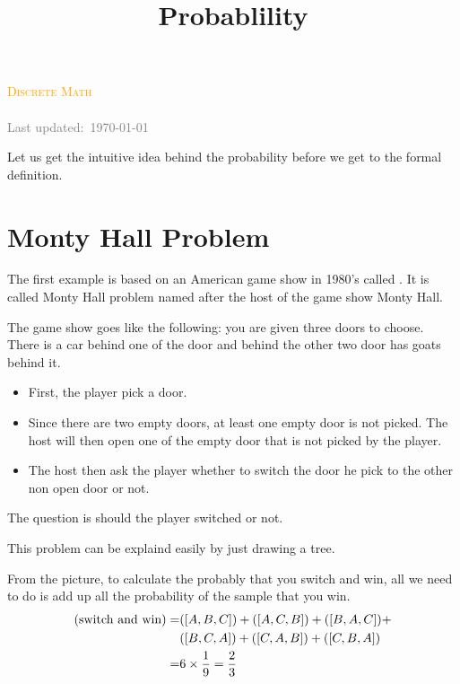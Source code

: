 \documentclass[a4paper, 12pt]{article}
\title{Probablility}
\let\Pr\relax
\DeclareMathOperator{\Pr}{Pr}
\newcommand{\course}{Discrete Math}
\begin{document}
\begin{center}
	\textcolor{orange}{\textsc{\course}}\\
	\huge\textbf{\textsc{\thetitle}}\\
	\small\textcolor{gray}{Last updated:\, \today \, \currenttime}\\
\end{center}


\begin{multicols}{2}
Let us get the intuitive idea behind the probability before we get to the formal definition. 

\section*{Monty Hall Problem}

The first example is based on an American game show in 1980's called . It is called Monty Hall problem named after the host of the game show Monty Hall.

The game show goes like the following: you are given three doors to choose. There is a car behind one of the door and behind the other two door has goats behind it.
\begin{itemize}
	\item First, the player pick a door.
	\item Since there are two empty doors, at least one empty door is not picked. The host will then open one of the empty door that is not picked by the player.
	\item The host then ask the player whether to switch the door he pick to the other non open door or not.
\end{itemize}
The question is should the player switched or not.

This problem can be explaind easily by just drawing a tree.
\end{multicols}




From the picture, to calculate the probably that you switch and win, all we need to do is add up all the probability of the sample that you win.
\begin{align*}
	\Pr(\text{switch and win}) = &\Pr([A,B,C]) + \Pr([A,C,B]) + \Pr([B,A,C]) +\\ &\Pr([B,C,A]) + \Pr([C,A,B]) + \Pr([C,B,A])\\
	=&6 \times \frac{1}{9} = \frac{2}{3}
\end{align*}
\end{document}

